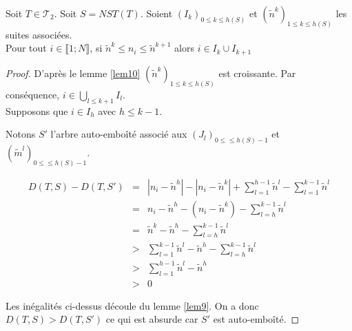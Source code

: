 \begin{lem}
  \label{lem11}
  Soit $T \in \mathcal{T}_{2}$. Soit $S = NST(T)$.  Soient
  $(I_{k})_{0 \leqslant k \leqslant h(S)}$ et
  $(\tilde{n}^{k})_{1 \leqslant k \leqslant h(S)}$ les suites
  associées.\\
  Pour tout $i \in \llbracket 1;N \rrbracket$, si $\tilde{n}^{k}
  \leqslant n_{i} \leqslant \tilde{n}^{k+1}$ alors $i \in I_{k} \cup
  I_{k+1}$
  \begin{proof}
    D'après le lemme \ref{lem10}
    $(\tilde{n}^{k})_{1 \leqslant k \leqslant h(S)}$ est
    croissante. Par conséquence, $i \in \bigcup_{l \leqslant k+1}
    I_{l}$.\\
    Supposons que $i \in I_{h}$ avec $h \leqslant k-1$.
    
    Notons $S'$ l'arbre auto-emboîté associé aux
    $(J_{l})_{0 \leqslant \leqslant h(S)-1}$ et
    $(\tilde{m}^{l})_{0 \leqslant \leqslant h(S)-1}$.
    \begin{center}
      $$
      \begin{array}{rcl}
        D(T,S) - D(T,S') &=& |n_{i}-\tilde{n}^{h}| -
                             |n_{i}-\tilde{n}^{k}| + \sum_{l=1}^{h-1}
                             \tilde{n}^{l} -\sum_{l=1}^{k-1} \tilde{n}^{l}\\
                         &=& n_{i} - \tilde{n}^{h} -
                             (n_{i}-\tilde{n}^{k}) - \sum_{l=h}^{k-1}
                             \tilde{n}^{l} \\
                         &=& \tilde{n}^{k} - \tilde{n}^{h} -
                             \sum_{l=h}^{k-1} \tilde{n}^{l} \\
                         &>& \sum_{l=1}^{k-1} \tilde{n}^{l} -
                             \tilde{n}^{h} - \sum_{l=h}^{k-1} \tilde{n}^{l} \\
                         &>& \sum_{l=1}^{h-1} \tilde{n}^{l} -
                             \tilde{n}^{h}\\
                         &>&0
      \end{array}
      $$
    \end{center}
    Les inégalités ci-dessus découle du lemme \ref{lem9}. 
    On a donc $D(T,S) > D(T,S')$ ce qui est absurde car $S'$ est auto-emboîté.
  \end{proof}
\end{lem}

